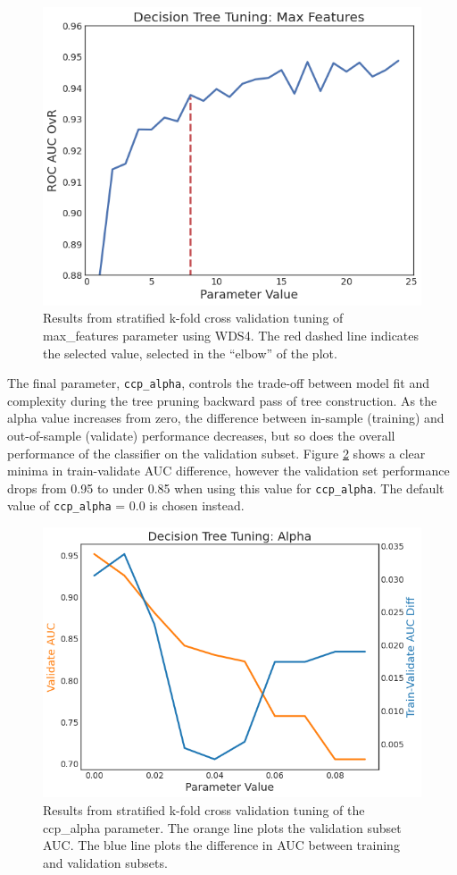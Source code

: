 \begin{figure}[!htp]
\centering
\includegraphics[width=.6\textwidth]{templates/images/Figure-DT_tuning_max_features.png}
\caption[Decision tree max features tuning]{Results from stratified k-fold cross validation tuning of max\_features parameter using WDS4. The red dashed line indicates the selected value, selected in the “elbow” of the plot.}
\label{fig:dtree_max_features}
\end{figure}

The final parameter, \verb|ccp_alpha|, controls the trade-off between model fit and complexity during the tree pruning backward pass of tree construction. As the alpha value increases from zero, the difference between in-sample (training) and out-of-sample (validate) performance decreases, but so does the overall performance of the classifier on the validation subset. Figure \ref{fig:dtree_alpha} shows a clear minima in train-validate AUC difference, however the validation set performance drops from 0.95 to under 0.85 when using this value for \verb|ccp_alpha|. The default value of \verb|ccp_alpha| = 0.0 is chosen instead.

\begin{figure}[!htp]
\centering
\includegraphics[width=.6\textwidth]{templates/images/Figure-DT_tuning_alpha.png}
\caption[Decision tree alpha tuning]{Results from stratified k-fold cross validation tuning of the ccp\_alpha parameter. The orange line plots the validation subset AUC. The blue line plots the difference in AUC between training and validation subsets.}
\label{fig:dtree_alpha}
\end{figure}

